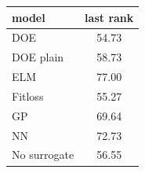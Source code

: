 \begin{tabular}{|lc|}
\hline
model & last rank\\
\hline
DOE & 54.73 \\
DOE plain & 58.73 \\
ELM & 77.00 \\
Fitloss & 55.27 \\
GP & 69.64 \\
NN & 72.73 \\
No surrogate & 56.55 \\
\hline
\end{tabular}
